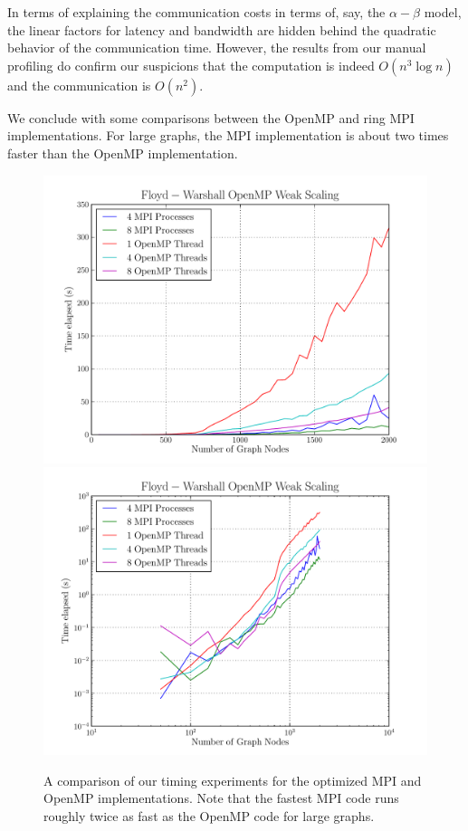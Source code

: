 \documentclass[12pt]{article}
\begin{document}
\vspace{0.75em}
\noindent In terms of explaining the communication costs in terms
of, say, the $\alpha-\beta$ model, the linear factors for latency and
bandwidth are hidden behind the quadratic behavior of the communication
time. However, the results from our manual profiling do confirm our suspicions
that the computation is indeed $O(n^3 \log n)$ and the communication is
$O(n^2)$.

\vspace{0.75em}
\noindent We conclude with some comparisons between the OpenMP and ring MPI
implementations. For large graphs, the MPI implementation is about two times
faster than the OpenMP implementation.

\begin{figure}
  \centering
  \includegraphics[scale=0.7]{../profiling/linear_comparison.pdf}
  \includegraphics[scale=0.7]{../profiling/log_comparison.pdf}
  \caption{A comparison of our timing experiments for the optimized
    MPI and OpenMP implementations. Note that the fastest MPI code
    runs roughly twice as fast as the OpenMP code for large graphs.}
\end{figure}
\end{document}

